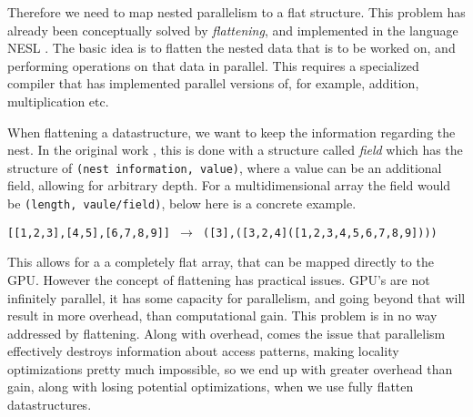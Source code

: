 Therefore we need to map nested parallelism to a flat structure. This problem has already been conceptually solved by \textit{flattening}, and implemented in the language NESL \cite{nesl}. The basic idea is to flatten the nested data that is to be worked on, and performing operations on that data in parallel. This requires a specialized compiler that has implemented parallel versions of, for example, addition, multiplication etc. 

When flattening a datastructure, we want to keep the information regarding the nest. In the original work \cite{flat}, this is done with a structure called \textit{field} which has the structure of \texttt{(nest information, value)}, where a value can be an additional field, allowing for arbitrary depth. For a multidimensional array the field would be \texttt{(length, vaule/field)}, below here is a concrete example.
\begin{center}
\texttt{[[1,2,3],[4,5],[6,7,8,9]] $\to$ ([3],([3,2,4]([1,2,3,4,5,6,7,8,9])))}
\end{center}
This allows for a a completely flat array, that can be mapped directly to the GPU. However the concept of flattening has practical issues. GPU's are not infinitely parallel, it has some capacity for parallelism, and going beyond that will result in more overhead, than computational gain. This problem is in no way addressed by flattening. Along with overhead, comes the issue that parallelism effectively destroys information about access patterns, making locality optimizations pretty much impossible, so we end up with greater overhead than gain, along with losing potential optimizations, when we use fully flatten datastructures. 

